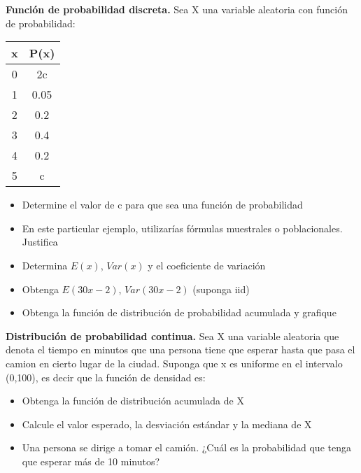\documentclass{oxmathproblems}
\begin{document}
\begin{questions}
\miquestion \textbf{Función de probabilidad discreta.} Sea X una variable aleatoria con función de probabilidad:

\begin{center}
\begin{tabular}{ |c|c| } 
 \hline
 \textbf{x} & \textbf{P(x)} \\ 
 \hline
 0 & 2c \\ 
 1 & 0.05 \\ 
 2 & 0.2 \\ 
 3 & 0.4 \\ 
 4 & 0.2 \\ 
 5 & c \\ 
 \hline
\end{tabular}
\end{center}

\begin{itemize}
\item Determine el valor de c para que sea una función de probabilidad
\item En este particular ejemplo, utilizarías fórmulas muestrales o poblacionales. Justifica
\item Determina $E(x)$, $Var(x)$ y el coeficiente de variación
\item Obtenga $E(30x-2)$, $Var(30x-2)$ (suponga iid)
\item Obtenga la función de distribución de probabilidad acumulada y grafique
\end{itemize}

\miquestion \textbf{Distribución de probabilidad continua.} Sea X una variable aleatoria que denota el tiempo en minutos que una persona tiene que esperar hasta que pasa el camion en cierto lugar de la ciudad. Suponga que x es uniforme en el intervalo (0,100), es decir que la función de densidad es:

\begin{itemize}
\item Obtenga la función de distribución acumulada de X
\item Calcule el valor esperado, la desviación estándar y la mediana de X
\item Una persona se dirige a tomar el camión. ¿Cuál es la probabilidad que tenga que esperar más de 10 minutos?
\end{itemize}



\end{questions}
\end{document}
